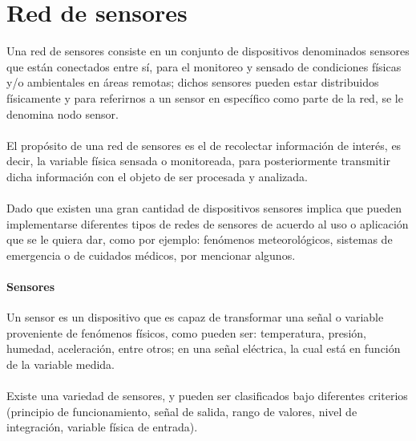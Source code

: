 \section{Red de sensores}
Una red de sensores consiste en un conjunto de dispositivos denominados sensores que están conectados entre sí, para el monitoreo y sensado de condiciones físicas y/o ambientales en áreas remotas; dichos sensores pueden estar distribuidos físicamente y para referirnos a un sensor en específico como parte de la red, se le denomina nodo sensor. 
\paragraph{}
El propósito de una red de sensores es el de recolectar información de interés, es decir, la variable física sensada o monitoreada, para posteriormente transmitir dicha información con el objeto de ser procesada y analizada. 
\paragraph{}
Dado que existen una gran cantidad de dispositivos sensores implica que pueden implementarse diferentes tipos de redes de sensores de acuerdo al uso o aplicación que se le quiera dar, como por ejemplo: fenómenos meteorológicos, sistemas de emergencia o de cuidados médicos, por mencionar algunos.\citep{MarcoTeorico16}

\paragraph{Sensores}
Un sensor es un dispositivo que es capaz de transformar una señal o variable proveniente de fenómenos físicos, como pueden ser: temperatura, presión, humedad, aceleración, entre otros; en una señal eléctrica, la cual está en función de la variable medida.\citep{MarcoTeorico20} 
\paragraph{}
Existe una variedad de sensores, y pueden ser clasificados bajo diferentes criterios (principio de funcionamiento, señal de salida, rango de valores, nivel de integración, variable física de entrada).

